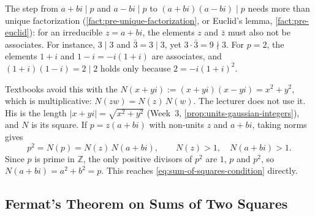 \begin{aiNote}
The step from $a + bi \mid p$ and $a - bi \mid p$ to $(a + bi)(a - bi) \mid p$ needs more than unique factorization (\cref{fact:pre-unique-factorization}, or Euclid's lemma, \cref{fact:pre-euclid}): for an irreducible $z = a + bi$, the elements $z$ and $\bar{z}$ must also not be associates. For instance, $3 \mid 3$ and $\bar{3} = 3 \mid 3$, yet $3 \cdot \bar{3} = 9 \nmid 3$. For $p = 2$, the elements $1 + i$ and $1 - i = -i(1 + i)$ are associates, and $(1 + i)(1 - i) = 2 \mid 2$ holds only because $2 = -i(1 + i)^2$.

Textbooks avoid this with the  $N(x + yi) := (x + yi)(x - yi) = x^2 + y^2$, which is multiplicative: $N(zw) = N(z) \, N(w)$. The lecturer does not use it. His  is the length $|x + yi| = \sqrt{x^2 + y^2}$ (Week~3, \cref{prop:units-gaussian-integers}), and $N$ is its square. If $p = z (a + bi)$ with non-units $z$ and $a + bi$, taking norms gives
\[
p^2 = N(p) = N(z) \, N(a + bi), \qquad N(z) > 1, \quad N(a + bi) > 1.
\]
Since $p$ is prime in $\mathbb{Z}$, the only positive divisors of $p^2$ are $1$, $p$ and $p^2$, so $N(a + bi) = a^2 + b^2 = p$. This reaches \eqref{eq:sum-of-squares-condition} directly.
\end{aiNote}

\subsection{Fermat's Theorem on Sums of Two Squares}

